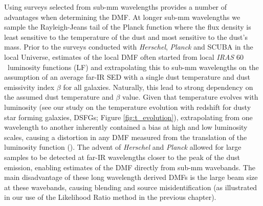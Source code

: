 Using surveys selected from sub-mm wavelengths provides a number of advantages when determining the DMF. At longer sub-mm wavelengths we sample the Rayleigh-Jeans tail of the Planck function where the flux density is least sensitive to the temperature of the dust and most sensitive to the dust's mass. Prior to the surveys conducted with \textit{Herschel}, \textit{Planck} and SCUBA in the local Universe, estimates of the local DMF often started from local \textit{IRAS} 60\,\micron\ luminosity functions (LF) and extrapolating this to sub-mm wavelengths on the assumption of an average far-IR SED with a single dust temperature and dust emissivity index $\beta$ for all galaxies. Naturally, this lead to strong dependency on the assumed dust temperature and $\beta$ value. Given that temperature evolves with luminosity (see our study on the temperature evolution with redshift for dusty star forming galaxies, DSFGs; Figure \ref{fig:t_evolution}), extrapolating from one wavelength to another inherently contained a bias at high and low luminosity scales, causing a distortion in any DMF measured from the translation of the luminosity function (\citealt{Dunne_2000}). The advent of \textit{Herschel} and \textit{Planck} allowed for large samples to be detected at far-IR wavelengths closer to the peak of the dust emission, enabling estimates of the DMF directly from sub-mm wavebands. The main disadvantage of these long wavelength derived DMFs is the large beam size at these wavebands, causing blending and source misidentification (as illustrated in our use of the Likelihood Ratio method in the previous chapter).

